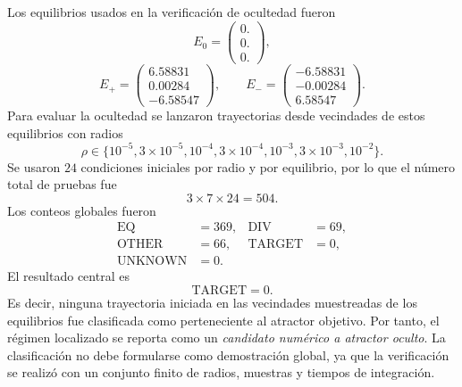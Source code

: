 \documentclass[journal]{IEEEtran}
\begin{document}
Los equilibrios usados en la verificación de ocultedad fueron
\[
E_0=
\begin{pmatrix}
0.\\
0.\\
0.
\end{pmatrix},
\]
\[
E_+=
\begin{pmatrix}
6.58831\\
0.00284\\
-6.58547
\end{pmatrix},
\qquad
E_-=
\begin{pmatrix}
-6.58831\\
-0.00284\\
6.58547
\end{pmatrix}.
\]
Para evaluar la ocultedad se lanzaron trayectorias desde vecindades de estos
equilibrios con radios
\[
\rho\in
\{10^{-5},3\times10^{-5},10^{-4},3\times10^{-4},
10^{-3},3\times10^{-3},10^{-2}\}.
\]
Se usaron \(24\) condiciones iniciales por radio y por equilibrio, por lo que
el número total de pruebas fue
\[
3\times 7\times 24=504.
\]
Los conteos globales fueron
\[
\begin{aligned}
\mathrm{EQ} &= 369, & \mathrm{DIV} &= 69,\\
\mathrm{OTHER} &= 66, & \mathrm{TARGET} &= 0,\\
\mathrm{UNKNOWN} &= 0.
\end{aligned}
\]
El resultado central es
\[
\mathrm{TARGET}=0.
\]
Es decir, ninguna trayectoria iniciada en las vecindades muestreadas de los
equilibrios fue clasificada como perteneciente al atractor objetivo. Por tanto,
el régimen localizado se reporta como un \emph{candidato numérico a atractor
oculto}. La clasificación no debe formularse como demostración global, ya que
la verificación se realizó con un conjunto finito de radios, muestras y tiempos
de integración.
\end{document}
